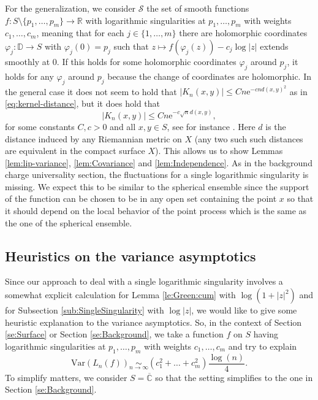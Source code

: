 \documentclass[10pt,reqno]{amsart}
\numberwithin{equation}{section}
\numberwithin{figure}{section}
\theoremstyle{plain}
\newcommand{\<}{\langle}
\renewcommand{\>}{\rangle}
\begin{document}
For the generalization, we consider
    $\mathcal{S}$ the set of smooth functions $f:S\setminus\{p_1,\ldots,p_m\}\to\mathbb{R}$ with logarithmic singularities at $p_1,\ldots,p_m$ with weights $c_1,\ldots,c_m$, meaning that for each $j \in \{1,\dots,m\}$ there are holomorphic coordinates $\varphi_j:\mathbb D \to S$ with $\varphi_j(0)=p_j$
    such that $z \mapsto f(\varphi_j(z)) - c_j\log|z|$ extends smoothly at $0$. If this holds for some 
    holomorphic coordinates $\varphi_j$ around $p_j$, it holds for any $\varphi_j$ around $p_j$ because the change of coordinates are holomorphic.
    In the general case it does
    not seem to hold that 
    $|K_n(x,y)| \leq Cn\mathrm{e}^{-c n d(x,y)^2}$
    as in 
    \eqref{eq:kernel-distance}, but it
    does hold that
    \[
    |K_n(x,y)|\leq Cn\mathrm{e}^{-c\sqrt{n}d(x,y)},
    \]
    for some constants $C,c>0$ and all $x,y\in S$,
    see for instance \cite[right after Th.~2.4]{MR2016088}.
    Here $d$ is the distance induced by any
    Riemannian metric on $X$ 
    (any two such such distances are equivalent
    in the compact surface $X$).
    This allows us to show Lemmas
    \ref{lem:lip-variance}, \ref{lem:Covariance} and
    \ref{lem:Independence}. As in the background charge universality section, the fluctuations for
    a single logarithmic singularity is missing.
    We expect this to be similar
    to the spherical ensemble since the support of
    the function
    can be chosen to be in any open set containing
    the point $x$ so that it should depend
    on the local behavior of
    the point process which is the same as the
    one of the spherical ensemble.
    
\subsection{Heuristics on the variance asymptotics}
\label{se:HeuristicsVarianceAsymptotics}

Since our approach to deal with
a single logarithmic singularity
involves a somewhat explicit calculation
 for Lemma \ref{le:Green:cum} with
 $\log(1+|z|^2)$ and for
Subsection \ref{sub:SingleSingularity} with
$\log|z|$, we would like to give some heuristic 
explanation to the variance asymptotics. 
So, in the context of Section \ref{se:Surface}
or Section \ref{se:Background}, we take 
a function $f$ on $S$
having logarithmic singularities at 
$p_1, \dots, p_m$ with weights 
$c_1,\dots,c_m$ and try to explain
\begin{equation}
\mathrm{Var}(L_n(f)) \underset{n\to\infty}{\sim} 
(c_1^2 + \dots + c_m^2)\frac{\log(n)}{4} .
\end{equation}
To simplify matters, we consider
$S = \overline{\mathbb C}$ so that the setting simplifies
to the one in
Section \ref{se:Background}.
\end{document}
